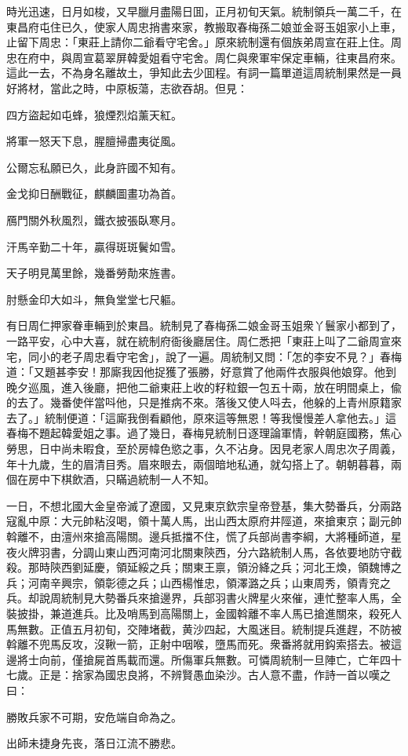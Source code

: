 時光迅速，日月如梭，又早臘月盡陽日囬，正月初旬天氣。統制領兵一萬二千，在東昌府屯住已久，使家人周忠捎書來家，教搬取春梅孫二娘並金哥玉姐家小上車，止留下周忠：「東莊上請你二爺看守宅舍。」原來統制還有個族弟周宣在莊上住。周忠在府中，與周宣葛翠屏韓愛姐看守宅舍。周仁與衆軍牢保定車輛，往東昌府來。這此一去，不為身名離故土，爭知此去少囬程。有詞一篇單道這周統制果然是一員好將材，當此之時，中原板蕩，志欲吞胡。但見：
\begin{myquote}
四方盜起如屯蜂，狼煙烈焰薰天紅。

將軍一怒天下息，腥膻掃盡夷従風。

公爾忘私願已久，此身許國不知有。

金戈抑日酬戰征，麒麟圖畫功為首。

鴈門關外秋風烈，鐵衣披張臥寒月。

汗馬辛勤二十年，贏得斑斑鬢如雪。

天子明見萬里餘，幾番勞勣來旌書。

肘懸金印大如斗，無負堂堂七尺軀。
\end{myquote}

有日周仁押家眷車輛到於東昌。統制見了春梅孫二娘金哥玉姐衆丫鬟家小都到了，一路平安，心中大喜，就在統制府衙後廳居住。周仁悉把「東莊上叫了二爺周宣來宅，同小的老子周忠看守宅舍」，說了一遍。周統制又問：「怎的李安不見？」春梅道：「又題甚李安！那廝我因他捉獲了張勝，好意賞了他兩件衣服與他娘穿。他到晚夕巡風，進入後廳，把他二爺東莊上收的籽粒銀一包五十兩，放在明間桌上，偸的去了。幾番使伴當呌他，只是推病不來。落後又使人呌去，他躲的上青州原籍家去了。」統制便道：「這廝我倒看顧他，原來這等無恩！等我慢慢差人拿他去。」這春梅不題起韓愛姐之事。過了幾日，春梅見統制日逐理論軍情，幹朝庭國務，焦心勞思，日中尚未暇食，至於房幃色慾之事，久不沾身。因見老家人周忠次子周義，年十九歲，生的眉清目秀。眉來眼去，兩個暗地私通，就勾搭上了。朝朝暮暮，兩個在房中下棋飲酒，只瞞過統制一人不知。

一日，不想北國大金皇帝滅了遼國，又見東京欽宗皇帝登基，集大勢番兵，分兩路寇亂中原：大元帥粘沒喝，領十萬人馬，出山西太原府井陘道，來搶東京；副元帥斡離不，由澶州來搶高陽關。邊兵抵擋不住，慌了兵部尚書李綱，大將種師道，星夜火牌羽書，分調山東山西河南河北關東陝西，分六路統制人馬，各依要地防守截殺。那時陝西劉延慶，領延綏之兵；關東王禀，領汾絳之兵；河北王煥，領魏博之兵；河南辛興宗，領彰德之兵；山西楊惟忠，領澤潞之兵；山東周秀，領青兖之兵。却說周統制見大勢番兵來搶邊界，兵部羽書火牌星火來催，連忙整率人馬，全裝披掛，兼道進兵。比及哨馬到高陽關上，金國斡離不率人馬已搶進關來，殺死人馬無數。正值五月初旬，交陣堵截，黄沙四起，大風迷目。統制提兵進趕，不防被斡離不兜馬反攻，沒鞦一箭，正射中咽喉，墮馬而死。衆番將就用鈎索搭去。被這邊將士向前，僅搶屍首馬載而還。所傷軍兵無數。可憐周統制一旦陣亡，亡年四十七歲。正是：捨家為國忠良將，不辨賢愚血染沙。古人意不盡，作詩一首以嘆之曰：
\begin{myquote}
勝敗兵家不可期，安危端自命為之。

出師未捷身先丧，落日江流不勝悲。
\end{myquote}

